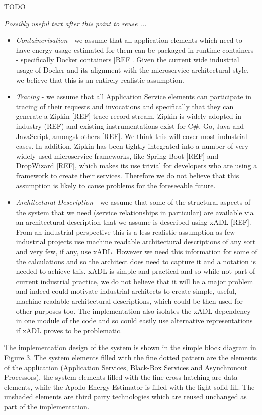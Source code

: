 TODO

\textit{Possibly useful text after this point to reuse ...}


\begin{itemize}
\item \emph{Containerisation} - we assume that all application elements which need to have energy usage estimated for them can be packaged in runtime containers - specifically Docker containers [REF].  Given the current wide industrial usage of Docker and its alignment with the microservice architectural style, we believe that this is an entirely realistic assumption.
\item \emph{Tracing} - we assume that all Application Service elements can participate in tracing of their requests and invocations and specifically that they can generate a Zipkin [REF] trace record stream.  Zipkin is widely adopted in industry (REF) and existing instrumentations exist for C\#, Go, Java and JavaScript, amongst others [REF].  We think this will cover most industrial cases.  In addition, Zipkin has been tightly integrated into a number of very widely used microservice frameworks, like Spring Boot [REF] and DropWizard [REF], which makes its use trivial for developers who are using a framework to create their services.  Therefore we do not believe that this assumption is likely to cause problems for the foreseeable future.
\item \emph{Architectural Description} - we assume that some of the structural aspects of the system that we need (service relationships in particular) are available via an architectural description that we assume is described using xADL [REF].  From an industrial perspective this is a less realistic assumption as few industrial projects use machine readable architectural descriptions of any sort and very few, if any, use xADL.  However we need this information for some of the calculations and so the architect does need to capture it and a notation is needed to achieve this. xADL is simple and practical and so while not part of current industrial practice, we do not believe that it will be a major problem and indeed could motivate industrial architects to create simple, useful, machine-readable architectural descriptions, which could be then used for other purposes too.  The implementation also isolates the xADL dependency in one module of the code and so could easily use alternative representations if xADL proves to be problematic.
\end{itemize}

The implementation design of the system is shown in the simple block diagram in Figure 3. The system elements filled with the fine dotted pattern are the elements of the application (Application Services, Black-Box Services and Asynchronout Processors), the system elements filled with the fine cross-hatching are data elements, while the Apollo Energy Estimator is filled with the light solid fill.  The unshaded elements are third party technologies which are reused unchanged as part of the implementation.

